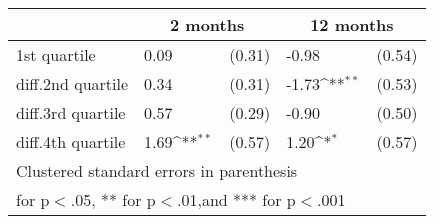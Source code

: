 {
\def\sym#1{\ifmmode^{#1}\else\(^{#1}\)\fi}
\begin{tabular*}{.65\hsize}{@{\hskip\tabcolsep\extracolsep\fill}l*{2}{lc}}
\toprule
                &\multicolumn{2}{c}{2 months}&\multicolumn{2}{c}{12 months}\\
\midrule
1st quartile    &     0.09         &   (0.31)&    -0.98         &   (0.54)\\
diff.2nd quartile&     0.34         &   (0.31)&    -1.73\sym{**} &   (0.53)\\
diff.3rd quartile&     0.57         &   (0.29)&    -0.90         &   (0.50)\\
diff.4th quartile&     1.69\sym{**} &   (0.57)&     1.20\sym{*}  &   (0.57)\\
\bottomrule
\multicolumn{5}{l}{\footnotesize Clustered standard errors in parenthesis}\\
\multicolumn{5}{l}{\footnotesize * for p$<$.05, ** for p$<$.01,and *** for p$<$.001}\\
\end{tabular*}
}
